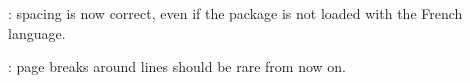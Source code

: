 \documentclass{tutodoc}
\begin{document}
\small

\begin{tdocfix}
    \item {}: spacing is now correct, even if the  package is not loaded with the French language.

    \item {} : page breaks around  lines should be rare from now on.
\end{tdocfix}
\end{document}
